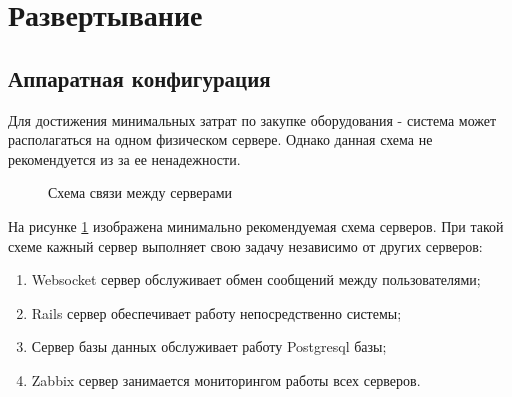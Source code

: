 \newpage
{}
\section{Развертывание}
\subsection{Аппаратная конфигурация}
Для достижения минимальных затрат по закупке оборудования - система может
располагаться на одном физическом сервере. Однако данная схема не рекомендуется
из за ее ненадежности.

\begin{figure}[h]
\caption{Схема связи между серверами}
\label{ris:hardware_configuration}
\end{figure}

На рисунке \ref{ris:hardware_configuration} изображена минимально рекомендуемая
схема серверов. При такой схеме кажный сервер выполняет свою задачу независимо
от других серверов:
\begin{enumerate}
  \item Websocket сервер обслуживает обмен сообщений между пользователями;
  \item Rails сервер обеспечивает работу непосредственно системы;
  \item Сервер базы данных обслуживает работу Postgresql базы;
  \item Zabbix сервер занимается мониторингом работы всех серверов.
\end{enumerate}






